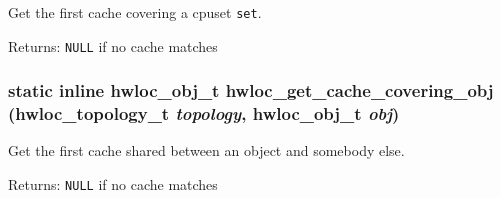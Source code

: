 Get the first cache covering a cpuset {\tt set}. 

\begin{Desc}
\item[Returns:]{\tt NULL} if no cache matches \end{Desc}
\hypertarget{group__hwlocality__helper__find__cache_gfdb27db8cae6b97c7e4271844e1ba986}{
\subsubsection[{hwloc\_\-get\_\-cache\_\-covering\_\-obj}]{\setlength{\rightskip}{0pt plus 5cm}static inline {\bf hwloc\_\-obj\_\-t} hwloc\_\-get\_\-cache\_\-covering\_\-obj ({\bf hwloc\_\-topology\_\-t} {\em topology}, \/  {\bf hwloc\_\-obj\_\-t} {\em obj})}}
\label{group__hwlocality__helper__find__cache_gfdb27db8cae6b97c7e4271844e1ba986}


Get the first cache shared between an object and somebody else. 

\begin{Desc}
\item[Returns:]{\tt NULL} if no cache matches \end{Desc}
